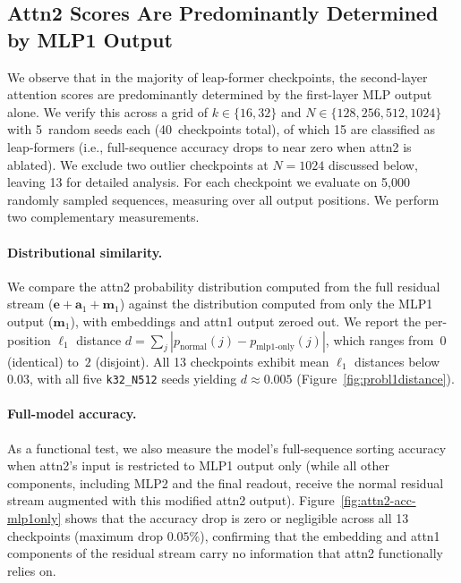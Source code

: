 \subsection{Attn2 Scores Are Predominantly Determined by MLP1 Output}
\label{sec:attn2-mlp1-dependence}

We observe that in the majority of leap-former checkpoints, the second-layer
attention scores are predominantly determined by the first-layer MLP output
alone. We verify this across a grid of $k \in \{16, 32\}$ and
$N \in \{128, 256, 512, 1024\}$ with 5~random seeds each (40~checkpoints
total), of which 15 are classified as leap-formers (i.e., full-sequence
accuracy drops to near zero when attn2 is ablated). We exclude two outlier
checkpoints at $N{=}1024$ discussed below, leaving 13 for detailed analysis.
For each checkpoint we evaluate on 5{,}000 randomly sampled sequences,
measuring over all output positions. We perform two complementary measurements.

\paragraph{Distributional similarity.}
We compare the attn2 probability distribution computed from the full residual
stream ($\mathbf{e} + \mathbf{a}_1 + \mathbf{m}_1$) against the distribution
computed from only the MLP1 output ($\mathbf{m}_1$), with embeddings and attn1
output zeroed out. We report the per-position $\ell_1$ distance
$d = \sum_j |p_{\text{normal}}(j) - p_{\text{mlp1-only}}(j)|$, which ranges
from~$0$ (identical) to~$2$ (disjoint). All 13 checkpoints exhibit mean
$\ell_1$ distances below $0.03$, with all five \texttt{k32\_N512} seeds
yielding $d \approx 0.005$ (Figure~\ref{fig:probl1distance}).

\paragraph{Full-model accuracy.}
As a functional test, we also measure the model's full-sequence sorting
accuracy when attn2's input is restricted to MLP1 output only (while all other
components, including MLP2 and the final readout, receive the normal residual
stream augmented with this modified attn2 output).
Figure~\ref{fig:attn2-acc-mlp1only} shows that the accuracy drop is zero or
negligible across all 13 checkpoints (maximum drop $0.05\%$), confirming that
the embedding and attn1 components of the residual stream carry no information
that attn2 functionally relies on.


